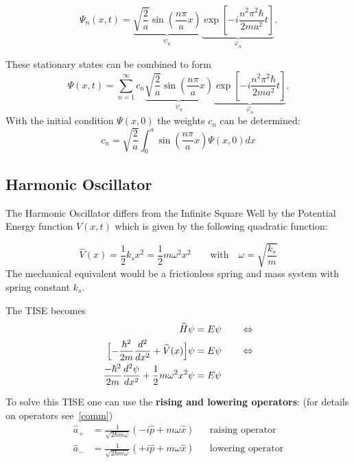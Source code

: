 \begin{equation*}
    \Psi_n(x,t)=\underbrace{\sqrt{\frac{2}{a}}\sin\left(\frac{n\pi}{a}x\right)}_{\psi_n} \underbrace{\exp\left[-i\frac{n^{2}\pi^{2}\hbar}{2ma^{2}}t\right]}_{\varphi_n}.
\end{equation*}


These stationary states can be combined to form
\noindent\begin{equation*}
    \Psi(x,t)=\sum_{n=1}^{\infty}c_{n} \underbrace{\sqrt{\frac{2}{a}}\sin\left(\frac{n\pi}{a}x\right)}_{\psi_n} \underbrace{\exp\left[-i\frac{n^{2}\pi^{2}\hbar}{2ma^{2}}t\right]}_{\varphi_n}.
\end{equation*}
With the initial condition $\Psi(x,0)$ the weights $c_n$ can be determined:
\noindent\begin{equation*}
    c_n=\sqrt{\frac{2}{a}}\int_0^a\sin\left(\frac{n\pi}{a}x\right)\Psi(x,0)dx
\end{equation*}


\subsection{Harmonic Oscillator}

The Harmonic Oscillator differs from the Infinite Square Well by the Potential Energy function $V(x,t)$ which is given by the following quadratic function:

\begin{equation*}
    \widehat{V}(x) = \frac{1}{2}k_s x^2 = \frac{1}{2}m \omega^2 x^2 \qquad \text{with} \quad \omega = \sqrt{\frac{k_s}{m}}
\end{equation*}
The mechanical equivalent would be a frictionless spring and mass system with spring constant $k_s$.

\newpar{}

The TISE becomes
\noindent\begin{align*}
    \widehat{H}\psi                                                          & = E\psi \qquad \Leftrightarrow \\
    \Bigl[-\frac{\hbar^2}{2m}\frac{d^2}{dx^2}+\widehat{V}(x)\Bigr]\psi       & = E\psi \qquad \Leftrightarrow \\
    \frac{-\hbar^2}{2m}\frac{d^2\psi}{dx^2} + \frac{1}{2}m \omega^2 x^2 \psi & = E\psi
\end{align*}


To solve this TISE one can use the \textbf{rising and lowering operators}: (for details on operators see~\ref{comm})
\begin{align*}
    \hat{a}_{+} & = \frac{1}{\sqrt{2\hbar m \omega}}\left(-i\hat{p}+m\omega\hat{x}\right) &  & \text{raising operator}  \\
    \hat{a}_{-} & = \frac{1}{\sqrt{2\hbar m \omega}}\left(+i\hat{p}+m\omega\hat{x}\right) &  & \text{lowering operator}
\end{align*}

